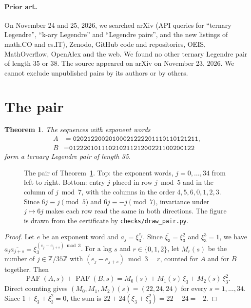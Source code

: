 \documentclass[11pt]{article}
\newtheorem{theorem}{Theorem}
\theoremstyle{remark}
\newcommand{\PAF}{\operatorname{PAF}}
\newcommand{\Z}{\mathbb{Z}}
\begin{document}
\paragraph{Prior art.} On November 24 and 25, 2026, we searched arXiv (API queries for ``ternary Legendre'', ``k-ary Legendre'' and ``Legendre pairs'', and the new listings of math.CO and cs.IT), Zenodo, GitHub code and repositories, OEIS, MathOverflow, OpenAlex and the web. We found no other ternary Legendre pair of length 35 or 38. The source appeared on arXiv on November 23, 2026. We cannot exclude unpublished pairs by its authors or by others.

\section{The pair}

\begin{theorem}\label{thm:main}
The sequences with exponent words
\begin{align*}
A &= \texttt{02021220020100021222201110110121211},\\
B &= \texttt{01222010111021021121200221100200122}
\end{align*}
form a ternary Legendre pair of length 35.
\end{theorem}

\begin{figure}[t]
\centering

\caption{The pair of Theorem~\ref{thm:main}. Top: the exponent words, $j = 0, \dots, 34$ from left to right. Bottom: entry $j$ placed in row $j \bmod 5$ and in the column of $j \bmod 7$, with the columns in the order $4, 5, 6, 0, 1, 2, 3$. Since $6j \equiv j \pmod 5$ and $6j \equiv -j \pmod 7$, invariance under $j \mapsto 6j$ makes each row read the same in both directions. The figure is drawn from the certificate by \texttt{checks/draw\_pair.py}.}
\label{fig:pair}
\end{figure}

\begin{proof}
Let $e$ be an exponent word and $a_j = \xi_3^{e_j}$. Since $\overline{\xi_3} = \xi_3^2$ and $\xi_3^3 = 1$, we have $a_j \overline{a_{j+s}} = \xi_3^{(e_j - e_{j+s}) \bmod 3}$. For a lag $s$ and $r \in \{0, 1, 2\}$, let $M_r(s)$ be the number of $j \in \Z/35\Z$ with $(e_j - e_{j+s}) \bmod 3 = r$, counted for $A$ and for $B$ together. Then
\[
  \PAF(A, s) + \PAF(B, s) = M_0(s) + M_1(s)\,\xi_3 + M_2(s)\,\xi_3^2 .
\]
Direct counting gives $(M_0, M_1, M_2)(s) = (22, 24, 24)$ for every $s = 1, \dots, 34$. Since $1 + \xi_3 + \xi_3^2 = 0$, the sum is $22 + 24(\xi_3 + \xi_3^2) = 22 - 24 = -2$.
\end{proof}
\end{document}

